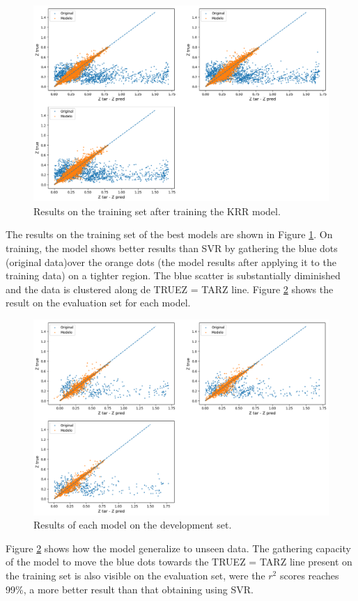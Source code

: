 \begin{figure}[th!]
	\centering
	\includegraphics[width=1.0\linewidth]{TeX_files/Imagenes/krr-train}
	\caption{Results on the training set after training the KRR model.}
	\label{fig:krr-train}
\end{figure}
The results on the training set of the best models are shown in Figure \ref{fig:krr-train}. On training, the model shows better results than SVR by gathering the blue dots (original data)over the orange dots (the model results after applying it to the training data) on a tighter region. The blue scatter is substantially diminished and the data is clustered along de TRUEZ = TARZ line. Figure \ref{fig:krr-test} shows the result on the evaluation set for each model. 
\begin{figure}[th!]
	\centering
	\includegraphics[width=1.0\linewidth]{TeX_files/Imagenes/krr-test}
	\caption{Results of each model on the development set.}
	\label{fig:krr-test}
\end{figure}
Figure \ref{fig:krr-test} shows how the model generalize to unseen data. The gathering capacity of the model to move the blue dots towards the TRUEZ = TARZ line present on the training set is also visible on the evaluation set, were the $r^2$ scores reaches 99\%, a more better result than that obtaining using SVR. 

